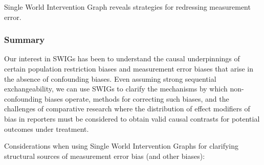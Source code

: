\documentclass[
  single column]{article}
\begin{document}
\begin{table}

\caption{\label{tbl-tblswigmex}Single World Intervention Graph reveals
strategies for redressing measurement error.}

\centering{

\tblswigmex

}

\end{table}%

\subsubsection{Summary}\label{summary-2}

Our interest in SWIGs has been to understand the causal underpinnings of
certain population restriction biases and measurement error biases that
arise in the absence of confounding biases. Even assuming strong
sequential exchangeability, we can use SWIGs to clarify the mechanisms
by which non-confounding biases operate, methods for correcting such
biases, and the challenges of comparative research where the
distribution of effect modifiers of bias in reporters must be considered
to obtain valid causal contrasts for potential outcomes under treatment.

Considerations when using Single World Intervention Graphs for
clarifying structural sources of measurement error bias (and other
biases):
\end{document}
